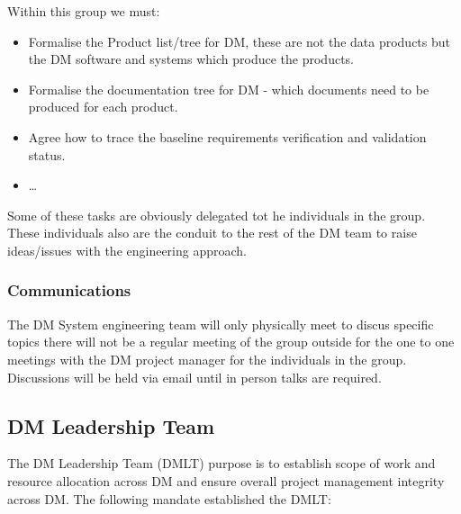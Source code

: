 Within this  group we must:
\begin{itemize}
\item Formalise the Product list/tree for DM, these are not the data products but the DM software and systems which produce the products. 
\item Formalise the documentation tree for DM - which documents need to be produced for each product. 
\item Agree how to trace the baseline requirements verification and validation status.
\item  \ldots
\end{itemize}
 Some of these tasks are obviously delegated tot he individuals in the group. These individuals also are the conduit to the rest of the DM team to raise ideas/issues with the engineering approach. 

 \subsubsection{Communications} 
 The DM System engineering team will only physically meet to discus specific topics there will not be a regular meeting of the group outside for the one to one meetings with the DM project manager for the individuals in the group. 
Discussions will be held via email until in person talks are required. 

\subsection{DM Leadership Team} \label{sect:dmlt}

The DM Leadership Team (DMLT) purpose is to establish scope of work and resource allocation across DM and ensure overall project management integrity across DM.
The following mandate established the DMLT:

